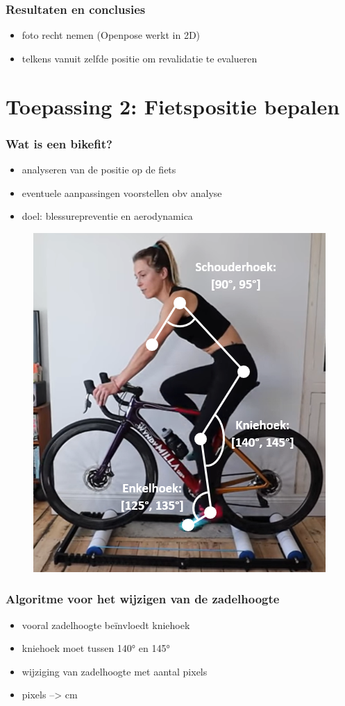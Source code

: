 \documentclass
   [kulak] %
   {kulakbeamer}
\begin{document}
\begin{frame}
\frametitle{Resultaten en conclusies}
\begin{itemize}
	\item foto recht nemen (Openpose werkt in 2D)
	\item telkens vanuit zelfde positie om revalidatie te evalueren
\end{itemize}
\end{frame}



\section{Toepassing 2: Fietspositie bepalen}

\begin{frame}
	\frametitle{Wat is een bikefit?}
	\begin{itemize}
		\item analyseren van de positie op de fiets
		\item eventuele aanpassingen voorstellen obv analyse
		\item doel: blessurepreventie en aerodynamica
	\end{itemize}
\begin{figure}
	\includegraphics[width= .4\textwidth]{bikefit_hoeken_foto}
\end{figure}
\end{frame}

\begin{frame}
	\frametitle{Algoritme voor het wijzigen van de zadelhoogte}
	\begin{itemize}
		\item vooral zadelhoogte beïnvloedt kniehoek
		\item kniehoek moet tussen 140° en 145°
		\item wijziging van zadelhoogte met aantal pixels
		\item pixels --> \si{cm}
	\end{itemize}
\end{frame}
\end{document}
